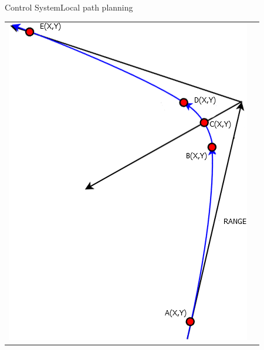 \begin{frame}{Control System}{Local path planning}
\begin{tabular}{l l}
\begin{minipage}{0.3\textwidth}
					\includegraphics[width = \textwidth]{control/img/positioning2}
				\end{minipage}
			\end{tabular}
			
		
\end{frame}



